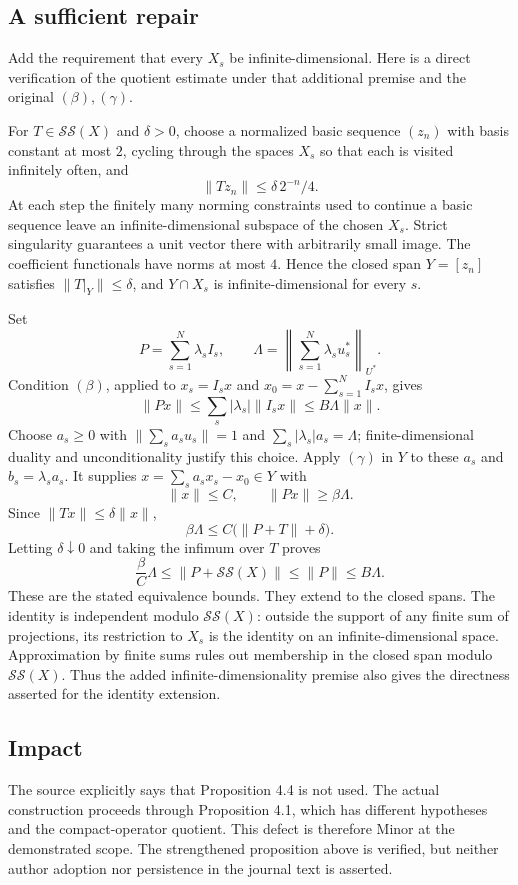 \documentclass[10pt]{article}
\begin{document}
\subsection*{A sufficient repair}
Add the requirement that every \(X_s\) be infinite-dimensional. Here is a direct verification of the quotient estimate under that additional premise and the original \((\beta),(\gamma)\).\par
For \(T\in\mathcal{SS}(X)\) and \(\delta>0\), choose a normalized basic sequence \((z_n)\) with basis constant at most \(2\), cycling through the spaces \(X_s\) so that each is visited infinitely often, and \[\|Tz_n\|\leq \delta\,2^{-n}/4.\] At each step the finitely many norming constraints used to continue a basic sequence leave an infinite-dimensional subspace of the chosen \(X_s\). Strict singularity guarantees a unit vector there with arbitrarily small image. The coefficient functionals have norms at most \(4\). Hence the closed span \(Y=[z_n]\) satisfies \(\|T|_Y\|\leq\delta\), and \(Y\cap X_s\) is infinite-dimensional for every \(s\).\par
Set \[P=\sum_{s=1}^N\lambda_sI_s,\qquad
 \Lambda=\left\|\sum_{s=1}^N\lambda_su_s^*\right\|_{U^*}.\] Condition \((\beta)\), applied to \(x_s=I_sx\) and \(x_0=x-\sum_{s=1}^NI_sx\), gives \[\|Px\|\leq\sum_s|\lambda_s|\|I_sx\|\leq B\Lambda\|x\|.\] Choose \(a_s\geq0\) with \(\|\sum_s a_su_s\|=1\) and \(\sum_s|\lambda_s|a_s=\Lambda\); finite-dimensional duality and unconditionality justify this choice. Apply \((\gamma)\) in \(Y\) to these \(a_s\) and \(b_s=\lambda_sa_s\). It supplies \(x=\sum_s a_sx_s-x_0\in Y\) with \[\|x\|\leq C,\qquad \|Px\|\geq\beta\Lambda.\] Since \(\|Tx\|\leq\delta\|x\|\), \[\beta\Lambda\leq C\bigl(\|P+T\|+\delta\bigr).\] Letting \(\delta\downarrow0\) and taking the infimum over \(T\) proves \[\frac{\beta}{C}\Lambda
 \leq \|P+\mathcal{SS}(X)\|
 \leq \|P\|\leq B\Lambda.\] These are the stated equivalence bounds. They extend to the closed spans. The identity is independent modulo \(\mathcal{SS}(X)\): outside the support of any finite sum of projections, its restriction to \(X_s\) is the identity on an infinite-dimensional space. Approximation by finite sums rules out membership in the closed span modulo \(\mathcal{SS}(X)\). Thus the added infinite-dimensionality premise also gives the directness asserted for the identity extension.\par
\subsection*{Impact}
The source explicitly says that Proposition 4.4 is not used. The actual construction proceeds through Proposition 4.1, which has different hypotheses and the compact-operator quotient. This defect is therefore Minor at the demonstrated scope. The strengthened proposition above is verified, but neither author adoption nor persistence in the journal text is asserted.\par
\end{document}
